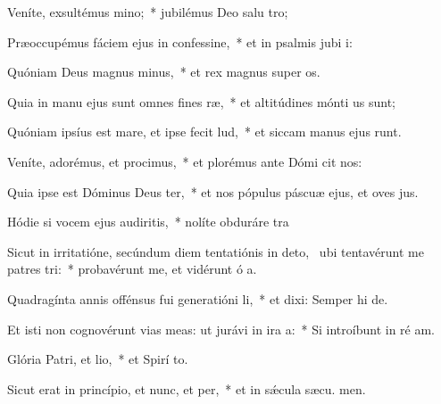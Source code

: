 \item Veníte, exsultémus mino;~* jubilémus Deo salu tro;
\item Præoccupémus fáciem ejus in confessine,~* et in psalmis jubi i:
\item Quóniam Deus magnus minus,~* et rex magnus super  os.
\item Quia in manu ejus sunt omnes fines ræ,~* et altitúdines mónti us sunt;
\item Quóniam ipsíus est mare, et ipse fecit lud,~* et siccam manus ejus runt.
\item Veníte, adorémus, et procimus,~* et plorémus ante Dómi  cit nos:
\item Quia ipse est Dóminus Deus ter,~* et nos pópulus páscuæ ejus, et oves  jus.
\item Hódie si vocem ejus audiritis,~* nolíte obduráre  tra
\item Sicut in irritatióne, secúndum diem tentatiónis in deto,~\pscross{} ubi tentavérunt me patres tri:~* probavérunt me, et vidérunt ó a.
\item Quadragínta annis offénsus fui generatióni li,~* et dixi: Semper hi  de.
\item Et isti non cognovérunt vias meas: ut jurávi in ira a:~* Si introíbunt in ré am.
\item Glória Patri, et lio,~* et Spirí to.
\item Sicut erat in princípio, et nunc, et per,~* et in sǽcula sæcu. men.
